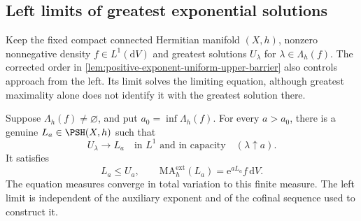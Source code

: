 \subsection{Left limits of greatest exponential solutions}

Keep the fixed compact connected Hermitian manifold $(X,h)$, nonzero nonnegative density $f\in L^1(\mathrm dV)$ and greatest solutions $U_\lambda$ for $\lambda\in\Lambda_h(f)$. The corrected order in \cref{lem:positive-exponent-uniform-upper-barrier} also controls approach from the left. Its limit solves the limiting equation, although greatest maximality alone does not identify it with the greatest solution there.

\begin{proposition}\label{prop:greatest-exponential-left-limit}
Suppose $\Lambda_h(f)\ne\varnothing$, and put $a_0=\inf\Lambda_h(f)$. For every $a>a_0$, there is a genuine $L_a\in\PSH(X,h)$ such that
\[
 U_\lambda\longrightarrow L_a
       \quad\text{in }L^1\text{ and in capacity}\quad(\lambda\uparrow a).
\]
It satisfies
\[
 L_a\leq U_a,\qquad
 \mathrm{MA}^{\mathrm{ext}}_h(L_a)=\mathrm e^{aL_a}f\,\mathrm dV.
\]
The equation measures converge in total variation to this finite measure. The left limit is independent of the auxiliary exponent and of the cofinal sequence used to construct it.
\end{proposition}
